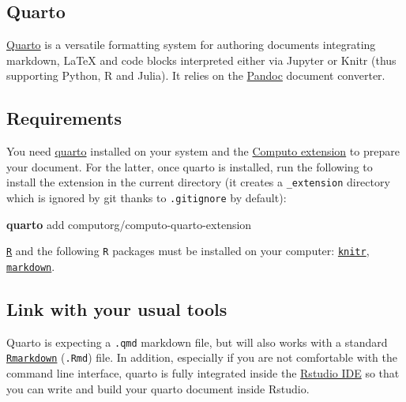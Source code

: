 \documentclass[
  11pt,
  a4paper,
]{article}
\newenvironment{Shaded}{}{}
\newcommand{\ExtensionTok}[1]{\textcolor[rgb]{0.84,0.23,0.29}{\textbf{#1}}}
\newcommand{\NormalTok}[1]{\textcolor[rgb]{0.14,0.16,0.18}{#1}}
\theoremstyle{plain}
\theoremstyle{remark}
\begin{document}
\subsection{Quarto}\label{quarto}

\href{https://quarto.org/}{Quarto} is a versatile formatting system for
authoring documents integrating markdown, LaTeX and code blocks
interpreted either via Jupyter or Knitr (thus supporting Python, R and
Julia). It relies on the \href{https://pandoc.org/MANUAL.html}{Pandoc}
document converter.

\subsection{Requirements}\label{requirements}

You need \href{https://quarto.org/}{quarto} installed on your system and
the \href{https://github.com/computorg/computo-quarto-extension}{Computo
extension} to prepare your document. For the latter, once quarto is
installed, run the following to install the extension in the current
directory (it creates a \texttt{\_extension} directory which is ignored
by git thanks to \texttt{.gitignore} by default):

\begin{Shaded}
\begin{Highlighting}[]
\ExtensionTok{quarto}\NormalTok{ add computorg/computo{-}quarto{-}extension}
\end{Highlighting}
\end{Shaded}

\href{https://www.r-project.org/}{\texttt{R}} and the following
\texttt{R} packages must be installed on your computer:
\href{https://cran.r-project.org/package=knitr}{\texttt{knitr}},
\href{https://cran.r-project.org/package=markdown}{\texttt{markdown}}.

\subsection{Link with your usual
tools}\label{link-with-your-usual-tools}

Quarto is expecting a \texttt{.qmd} markdown file, but will also works
with a standard
\href{https://rmarkdown.rstudio.com/}{\texttt{Rmarkdown}}
(\texttt{.Rmd}) file. In addition, especially if you are not comfortable
with the command line interface, quarto is fully integrated inside the
\href{https://quarto.org/docs/get-started/hello/rstudio.html}{Rstudio
IDE} so that you can write and build your quarto document inside
Rstudio.
\end{document}
